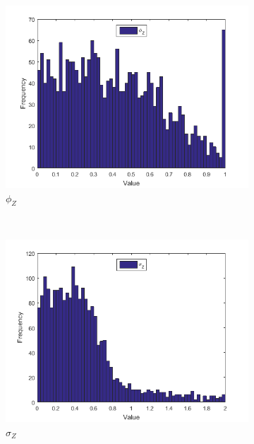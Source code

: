 \documentclass[11pt,a4,twosided,singlespacing,titlepagenumber=on]{scrreprt}
\numberwithin{equation}{chapter} %
\theoremstyle{remark}
\begin{document}
\begin{figure}[H]
\begin{subfigure}[t]{0.32\textwidth}
        \includegraphics[width=1\textwidth]{res/params/731_1462/3}
        \caption{$\phi_Z$}
    \end{subfigure} \\
    \begin{subfigure}[t]{0.32\textwidth}
        \centering
        \includegraphics[width=1\textwidth]{res/params/731_1462/4}
        \caption{$\sigma_Z$}
    \end{subfigure}
    \begin{subfigure}[t]{0.32\textwidth}
        \centering

\end{subfigure}
\end{figure}
\end{document}
